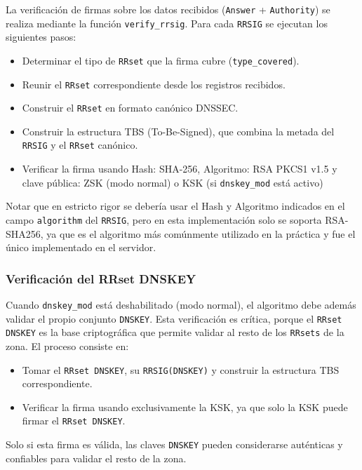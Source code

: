 La verificación de firmas sobre los datos recibidos (\texttt{Answer} + \texttt{Authority}) se realiza mediante la función \texttt{verify\_rrsig}. 
Para cada \texttt{RRSIG} se ejecutan los siguientes pasos:

\begin{itemize}
    \item Determinar el tipo de \texttt{RRset} que la firma cubre (\texttt{type\_covered}).
    \item Reunir el \texttt{RRset} correspondiente desde los registros recibidos.
    \item Construir el \texttt{RRset} en formato canónico DNSSEC.
    \item Construir la estructura TBS (To-Be-Signed), que combina la metada del \texttt{RRSIG} y el \texttt{RRset} canónico.
    \item Verificar la firma usando Hash: SHA-256, Algoritmo: RSA PKCS1 v1.5 y clave pública: ZSK (modo normal) o KSK (si \texttt{dnskey\_mod} está activo)
\end{itemize}

Notar que en estricto rigor se debería usar el Hash y Algoritmo indicados en el campo \texttt{algorithm} del \texttt{RRSIG}, pero en esta implementación solo se soporta RSA-SHA256,
ya que es el algoritmo más comúnmente utilizado en la práctica y fue el único implementado en el servidor.

\subsubsection{Verificación del RRset DNSKEY}

Cuando \texttt{dnskey\_mod} está deshabilitado (modo normal), el algoritmo debe además validar el propio conjunto \texttt{DNSKEY}. Esta verificación es crítica, porque el \texttt{RRset DNSKEY} es la base 
criptográfica que permite validar al resto de los \texttt{RRsets} de la zona. El proceso consiste en:

\begin{itemize}
    \item Tomar el \texttt{RRset DNSKEY}, su \texttt{RRSIG(DNSKEY)} y construir la estructura TBS correspondiente.
    \item Verificar la firma usando exclusivamente la KSK, ya que solo la KSK puede firmar el \texttt{RRset DNSKEY}.
\end{itemize}

Solo si esta firma es válida, las claves \texttt{DNSKEY} pueden considerarse auténticas y confiables para validar el resto de la zona.


